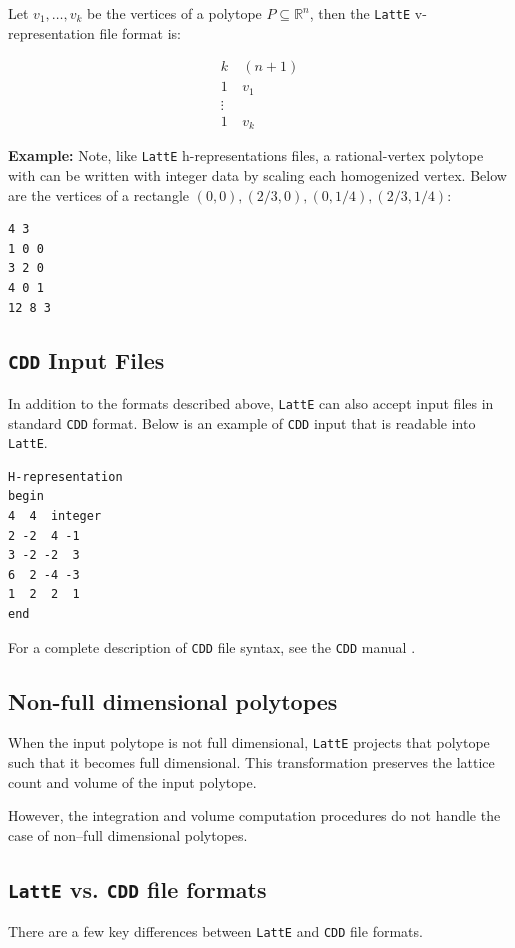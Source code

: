 \documentclass{article}
\newcommand{\R}{{\mathbb R}}
\newcommand{\latte}{{\tt LattE}\xspace}
\newcommand{\cdd}{{\tt CDD}\xspace}
\newcommand{\example}{{\bf Example:\space}}
\begin{document}
Let $v_1, \dots, v_k$ be the vertices of a polytope $P \subseteq \R^n$, then the \latte v-representation file format is:

\begin{align*}
	k &\: (n+1)\\
	1 &\: v_1\\
	\vdots & \\
	1 &\: v_k
\end{align*}


\example
Note, like \latte h-representations files, a rational-vertex polytope with can be written with integer data by scaling each homogenized vertex. Below are the vertices of a rectangle $(0,0), (2/3,0), (0,1/4), (2/3, 1/4)$:
\begin{verbatim}
4 3
1 0 0
3 2 0
4 0 1
12 8 3
\end{verbatim}

\subsection{\cdd Input Files}
In addition to the formats described above, {\tt LattE} can also
accept input files in standard \cdd format. Below is
an example of \cdd input that is readable into \latte.
\begin{verbatim}
H-representation
begin
4  4  integer
2 -2  4 -1
3 -2 -2  3
6  2 -4 -3
1  2  2  1
end
\end{verbatim}

For a complete description of \cdd file syntax, see the \cdd manual \cite{fukuda}.

\subsection{Non-full dimensional polytopes}

When the input polytope is not full dimensional, \latte projects that polytope
such that it becomes full dimensional. This transformation preserves the
lattice count and volume of the input polytope. 

However, the integration and volume computation procedures do not handle the
case of non--full dimensional polytopes.

\subsection{\latte vs. \cdd file formats}
There are a few key differences between \latte and \cdd file formats.
\end{document}
